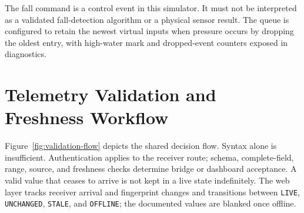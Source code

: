The fall command is a control event in this simulator. It must not be interpreted as a validated fall-detection algorithm or a physical sensor result. The queue is configured to retain the newest virtual inputs when pressure occurs by dropping the oldest entry, with high-water mark and dropped-event counters exposed in diagnostics.

\clearpage
\section{Telemetry Validation and Freshness Workflow}
Figure~\ref{fig:validation-flow} depicts the shared decision flow. Syntax alone is insufficient. Authentication applies to the receiver route; schema, complete-field, range, source, and freshness checks determine bridge or dashboard acceptance. A valid value that ceases to arrive is not kept in a live state indefinitely. The web layer tracks receiver arrival and fingerprint changes and transitions between \texttt{LIVE}, \texttt{UNCHANGED}, \texttt{STALE}, and \texttt{OFFLINE}; the documented values are blanked once offline.

